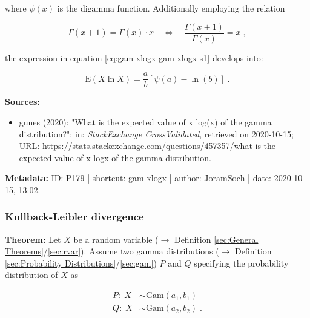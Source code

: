 \documentclass[a4paper,12pt,twoside]{book}
\begin{document}
where $\psi(x)$ is the digamma function. Additionally employing the relation

\begin{equation} \label{eq:gam-xlogx-gam-fct}
\Gamma(x+1) = \Gamma(x) \cdot x \quad \Leftrightarrow \quad \frac{\Gamma(x+1)}{\Gamma(x)} = x \; ,
\end{equation}

the expression in equation \eqref{eq:gam-xlogx-gam-xlogx-s1} develops into:

\begin{equation} \label{eq:gam-xlogx-gam-xlogx-qed}
\mathrm{E}(X \ln X) = \frac{a}{b} \left[ \psi(a) - \ln(b) \right] \; .
\end{equation}


\vspace{1em}
\textbf{Sources:}
\begin{itemize}
\item gunes (2020): "What is the expected value of x log(x) of the gamma distribution?"; in: \textit{StackExchange CrossValidated}, retrieved on 2020-10-15; URL: \url{https://stats.stackexchange.com/questions/457357/what-is-the-expected-value-of-x-logx-of-the-gamma-distribution}.
\end{itemize}


\vspace{1em}
\textbf{Metadata:} ID: P179 | shortcut: gam-xlogx | author: JoramSoch | date: 2020-10-15, 13:02.
\vspace{1em}



\subsubsection[\textbf{Kullback-Leibler divergence}]{Kullback-Leibler divergence} \label{sec:gam-kl}
\setcounter{equation}{0}

\textbf{Theorem:} Let $X$ be a random variable ($\rightarrow$ Definition \ref{sec:General Theorems}/\ref{sec:rvar}). Assume two gamma distributions ($\rightarrow$ Definition \ref{sec:Probability Distributions}/\ref{sec:gam}) $P$ and $Q$ specifying the probability distribution of $X$ as

\begin{equation} \label{eq:gam-kl-gams}
\begin{split}
P: \; X &\sim \mathrm{Gam}(a_1, b_1) \\
Q: \; X &\sim \mathrm{Gam}(a_2, b_2) \; . \\
\end{split}
\end{equation}
\end{document}
